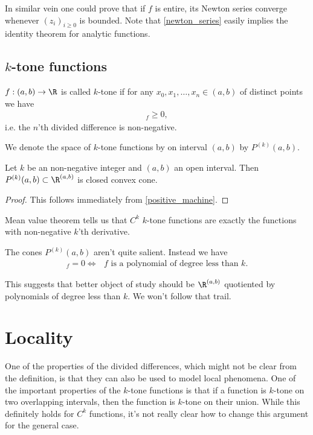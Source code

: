 In similar vein one could prove that if $f$ is entire, its Newton series converge whenever $(z_{i})_{i \geq 0}$ is bounded. Note that \ref{newton_series} easily implies the identity theorem for analytic functions.


\subsection{$k$-tone functions}

\begin{maar}
	$f : (a, b) \to \R$ is called $k$-tone if for any $x_{0}, x_{1}, \ldots, x_{n} \in (a, b)$ of distinct points we have
	\begin{align*}
		[x_{0}, x_{1}, \ldots, x_{n}]_{f} \geq 0,
	\end{align*}
	i.e. the $n$'th divided difference is non-negative.
\end{maar}

We denote the space of $k$-tone functions by on interval $(a, b)$ by $P^{(k)}(a, b)$.

\begin{lause}
	Let $k$ be an non-negative integer and $(a, b)$ an open interval. Then $P^{(k)}(a, b) \subset \R^{(a, b)}$ is closed convex cone.
\end{lause}
\begin{proof}
	This follows immediately from \ref{positive_machine}.
\end{proof}

Mean value theorem tells us that $C^{k}$ $k$-tone functions are exactly the functions with non-negative $k$'th derivative.

The cones $P^{(k)}(a, b)$ aren't quite salient. Instead we have
\begin{align*}
	[\cdot, \cdot, \ldots, \cdot]_{f} = 0 \Leftrightarrow \text{ $f$ is a polynomial of degree less than $k$}.
\end{align*}

This suggests that better object of study should be $\R^{(a, b)}$ quotiented by polynomials of degree less than $k$. We won't follow that trail.

\section{Locality}

One of the properties of the divided differences, which might not be clear from the definition, is that they can also be used to model local phenomena. One of the important properties of the $k$-tone functions is that if a function is $k$-tone on two overlapping intervals, then the function is $k$-tone on their union. While this definitely holds for $C^{k}$ functions, it's not really clear how to change this argument for the general case.

